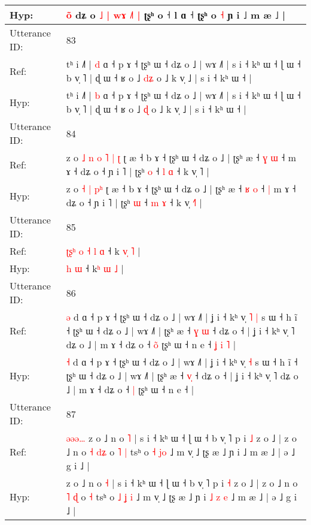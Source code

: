 \documentclass[10pt]{article}
\DeclareRobustCommand{\hl}[1]{{\textcolor{red}{#1}}}
\begin{document}
\begin{longtable}{ll}
 \\
Hyp: & \hl{o}\hl{̃} dʑ o\hl{ }\hl{˩}\hl{ }\hl{|}\hl{ }\hl{w}\hl{ɤ}\hl{ }\hl{˩}\hl{˥}\hl{ }\hl{|} ʈʂʰ o ˧ l ɑ ˧ ʈʂʰ o \hl{˧} ɲ i ˩ m æ ˩ |
 \\
\midrule
Utterance ID: & 83 \\
Ref: & tʰ i ˩˥ | \hl{d} ɑ ˧ p ɤ ˧ ʈʂʰ ɯ ˧ dʑ o ˩ | wɤ ˩˥ | s i ˧ kʰ ɯ ˧ ɭ ɯ ˧ b v̩ ˥ | ɖ ɯ ˧ ʁ o ˩ \hl{d}\hl{ʑ} o ˩ k v̩ ˩ | s i ˧ kʰ ɯ ˧ |
 \\
Hyp: & tʰ i ˩˥ | \hl{b} ɑ ˧ p ɤ ˧ ʈʂʰ ɯ ˧ dʑ o ˩ | wɤ ˩˥ | s i ˧ kʰ ɯ ˧ ɭ ɯ ˧ b v̩ ˥ | ɖ ɯ ˧ ʁ o ˩ \hl{}\hl{ɖ} o ˩ k v̩ ˩ | s i ˧ kʰ ɯ ˧ |
 \\
\midrule
Utterance ID: & 84 \\
Ref: & z o\hl{ }\hl{˩}\hl{ }\hl{n} \hl{o} \hl{˥} \hl{|}\hl{ }\hl{ʈ} ʈ æ ˧ b ɤ ˧ ʈʂʰ ɯ ˧ dʑ o ˩ | ʈʂʰ æ ˧ \hl{ɣ} \hl{ɯ} ˧\hl{}\hl{} m ɤ ˧ dʑ o ˧ ɲ i ˥ | ʈʂʰ \hl{o} ˧ \hl{l} \hl{ɑ} ˧ k v̩ \hl{}˥ |
 \\
Hyp: & z o\hl{}\hl{}\hl{}\hl{} \hl{˧} \hl{|} \hl{}\hl{p}\hl{ʰ} ʈ æ ˧ b ɤ ˧ ʈʂʰ ɯ ˧ dʑ o ˩ | ʈʂʰ æ ˧ \hl{ʁ} \hl{o} ˧\hl{ }\hl{|} m ɤ ˧ dʑ o ˧ ɲ i ˥ | ʈʂʰ \hl{ɯ} ˧ \hl{m} \hl{ɤ} ˧ k v̩ \hl{˧}˥ |
 \\
\midrule
Utterance ID: & 85 \\
Ref: & \hl{ʈ}\hl{ʂ}\hl{ʰ}\hl{ }\hl{o}\hl{ }\hl{˧}\hl{ }\hl{l} \hl{ɑ} ˧ k\hl{ }\hl{v}\hl{̩} \hl{˥} |
 \\
Hyp: & \hl{}\hl{}\hl{}\hl{}\hl{}\hl{}\hl{}\hl{}\hl{h} \hl{ɯ} ˧ k\hl{ʰ}\hl{ }\hl{ɯ} \hl{˩} |
 \\
\midrule
Utterance ID: & 86 \\
Ref: & \hl{ə} d ɑ ˧ p ɤ ˧ ʈʂʰ ɯ ˧ dʑ o ˩ | wɤ ˩˥ | ʝ i ˧ kʰ v̩\hl{ }\hl{˥} \hl{|} s ɯ ˧ h ĩ ˧ ʈʂʰ ɯ ˧ dʑ o ˩ | wɤ ˩˥ | ʈʂʰ æ ˧ \hl{ɣ}\hl{ }\hl{ɯ} ˧ dʑ o ˧ | ʝ i ˧ kʰ v̩ ˥ dʑ o ˩ | m ɤ ˧ dʑ o ˧ \hl{o}\hl{̃} ʈʂʰ ɯ ˧ n e ˧\hl{ }\hl{ʝ}\hl{ }\hl{i}\hl{ }\hl{˥} |
 \\
Hyp: & \hl{˧} d ɑ ˧ p ɤ ˧ ʈʂʰ ɯ ˧ dʑ o ˩ | wɤ ˩˥ | ʝ i ˧ kʰ v̩\hl{}\hl{} \hl{˧} s ɯ ˧ h ĩ ˧ ʈʂʰ ɯ ˧ dʑ o ˩ | wɤ ˩˥ | ʈʂʰ æ ˧ \hl{}\hl{v}\hl{̩} ˧ dʑ o ˧ | ʝ i ˧ kʰ v̩ ˥ dʑ o ˩ | m ɤ ˧ dʑ o ˧ \hl{}\hl{|} ʈʂʰ ɯ ˧ n e ˧\hl{}\hl{}\hl{}\hl{}\hl{}\hl{} |
 \\
\midrule
Utterance ID: & 87 \\
Ref: & \hl{ə}\hl{ə}\hl{ə}\hl{…}\hl{ }z o ˩ n o \hl{˥} | s i ˧ kʰ ɯ ˧ ɭ ɯ ˧ b v̩ ˥ p i \hl{˩} z o ˩ | z o ˩ n o \hl{˧} \hl{d}\hl{ʑ} o\hl{ }\hl{˥} \hl{|} tsʰ o \hl{˧} \hl{}\hl{j}\hl{o} ˩ m v̩ ˩ ʈʂ æ ˩ ɲ i\hl{}\hl{}\hl{}\hl{}\hl{}\hl{} ˩ m æ ˩ | ə ˩ g i ˩ |
 \\
Hyp: & \hl{}\hl{}\hl{}\hl{}\hl{}z o ˩ n o \hl{˧} | s i ˧ kʰ ɯ ˧ ɭ ɯ ˧ b v̩ ˥ p i \hl{˧} z o ˩ | z o ˩ n o \hl{˥} \hl{}\hl{ɖ} o\hl{}\hl{} \hl{˧} tsʰ o \hl{˩} \hl{ʝ}\hl{ }\hl{i} ˩ m v̩ ˩ ʈʂ æ ˩ ɲ i\hl{ }\hl{˩}\hl{ }\hl{z}\hl{ }\hl{e} ˩ m æ ˩ | ə ˩ g i ˩ |

\end{longtable}
\end{document}
